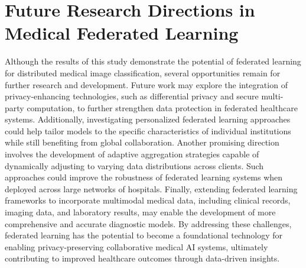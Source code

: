 \documentclass[12pt]{book}
\begin{document}
\section{Future Research Directions in Medical Federated Learning}
Although the results of this study demonstrate the potential of federated learning for distributed medical image classification, several opportunities remain for further research and development.
Future work may explore the integration of privacy-enhancing technologies, such as differential privacy and secure multi-party computation, to further strengthen data protection in federated healthcare systems. Additionally, investigating personalized federated learning approaches could help tailor models to the specific characteristics of individual institutions while still benefiting from global collaboration.
Another promising direction involves the development of adaptive aggregation strategies capable of dynamically adjusting to varying data distributions across clients. Such approaches could improve the robustness of federated learning systems when deployed across large networks of hospitals.
Finally, extending federated learning frameworks to incorporate multimodal medical data, including clinical records, imaging data, and laboratory results, may enable the development of more comprehensive and accurate diagnostic models.
By addressing these challenges, federated learning has the potential to become a foundational technology for enabling privacy-preserving collaborative medical AI systems, ultimately contributing to improved healthcare outcomes through data-driven insights.




\end{document}
